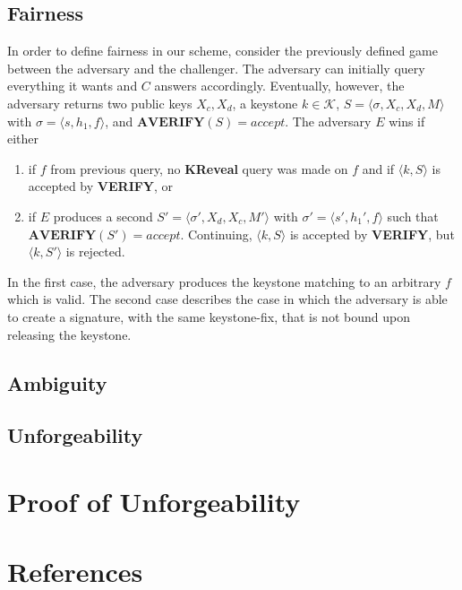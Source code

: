 \documentclass[final]{IEEEtran}%
\newcommand{\goedel}[1]{\langle #1 \rangle}
\newcommand{\kspace}{\mathcal{K}}
\begin{document}
  \subsection{Fairness}
    In order to define fairness in our scheme, consider the previously defined game between the adversary and the challenger.
    The adversary can initially query everything it wants and \(C\) answers accordingly.
    Eventually, however, the adversary returns two public keys \(X_c, X_d\), a keystone \(k\in\kspace\), \(S=\goedel{\sigma, X_c, X_d, M}\) with \(\sigma=\goedel{s, h_1, f}\), and \(\textbf{AVERIFY}(S) = accept\).
    The adversary \(E\) wins if either
      \begin{enumerate}
        \item if \(f\) from previous query, no \textbf{KReveal} query was made on \(f\) and if \(\goedel{k,S}\) is accepted by \textbf{VERIFY}, or
        \item if \(E\) produces a second \(S' = \goedel{\sigma', X_d, X_c, M'}\) with \(\sigma' = \goedel{s', h_1', f}\) such that \(\textbf{AVERIFY}(S')=accept\).
              Continuing, \(\goedel{k,S}\) is accepted by \textbf{VERIFY}, but  \(\goedel{k,S'}\) is rejected.
      \end{enumerate}
    In the first case, the adversary produces the keystone matching to an arbitrary \(f\) which is valid.
    The second case describes the case in which the adversary is able to create a signature, with the same keystone-fix, that is not bound upon releasing the keystone.

  \subsection{Ambiguity}

  \subsection{Unforgeability}

\section{Proof of Unforgeability}

\section*{References}



\end{document}
